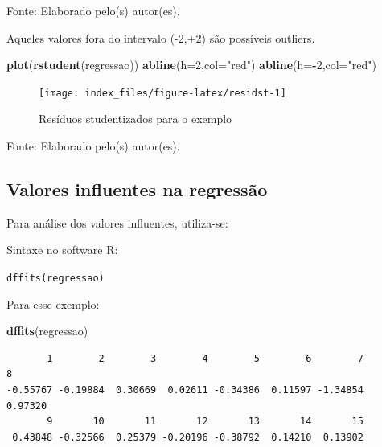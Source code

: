 \documentclass[12pt,brazil,]{book}
\newenvironment{Shaded}{\begin{snugshade}}{\end{snugshade}}
\newcommand{\DataTypeTok}[1]{\textcolor[rgb]{0.13,0.29,0.53}{#1}}
\newcommand{\DecValTok}[1]{\textcolor[rgb]{0.00,0.00,0.81}{#1}}
\newcommand{\KeywordTok}[1]{\textcolor[rgb]{0.13,0.29,0.53}{\textbf{#1}}}
\newcommand{\NormalTok}[1]{#1}
\newcommand{\OperatorTok}[1]{\textcolor[rgb]{0.81,0.36,0.00}{\textbf{#1}}}
\newcommand{\StringTok}[1]{\textcolor[rgb]{0.31,0.60,0.02}{#1}}
\begin{document}
Fonte: Elaborado pelo(s) autor(es).

Aqueles valores fora do intervalo (-2,+2) são possíveis outliers.

\begin{Shaded}
\begin{Highlighting}[]
\KeywordTok{plot}\NormalTok{(}\KeywordTok{rstudent}\NormalTok{(regressao)) }
\KeywordTok{abline}\NormalTok{(}\DataTypeTok{h=}\DecValTok{2}\NormalTok{,}\DataTypeTok{col=}\StringTok{"red"}\NormalTok{)}
\KeywordTok{abline}\NormalTok{(}\DataTypeTok{h=}\OperatorTok{-}\DecValTok{2}\NormalTok{,}\DataTypeTok{col=}\StringTok{"red"}\NormalTok{)}
\end{Highlighting}
\end{Shaded}

\begin{figure}

{\centering \texttt{[image: index\_files/figure-latex/residst-1]} 

}

\caption{Resíduos studentizados para o exemplo}\label{fig:residst}
\end{figure}

Fonte: Elaborado pelo(s) autor(es).

\hypertarget{valores-influentes-na-regressao}{%
\subsection{Valores influentes na
regressão}\label{valores-influentes-na-regressao}}

Para análise dos valores influentes, utiliza-se:

Sintaxe no software R:

\texttt{dffits(regressao)}

Para esse exemplo:

\begin{Shaded}
\begin{Highlighting}[]
\KeywordTok{dffits}\NormalTok{(regressao)}
\end{Highlighting}
\end{Shaded}

\begin{verbatim}
       1        2        3        4        5        6        7        8 
-0.55767 -0.19884  0.30669  0.02611 -0.34386  0.11597 -1.34854  0.97320 
       9       10       11       12       13       14       15 
 0.43848 -0.32566  0.25379 -0.20196 -0.38792  0.14210  0.13902 
\end{verbatim}
\end{document}
